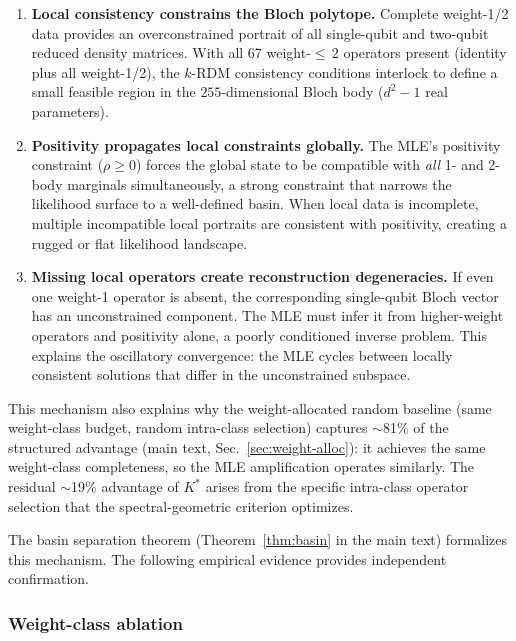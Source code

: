 \documentclass[twocolumn,prx,aps,superscriptaddress,longbibliography,floatfix]{revtex4-2}
\begin{document}
\begin{enumerate}
\item \textbf{Local consistency constrains the Bloch polytope.}
Complete weight-1/2 data provides an overconstrained portrait of
all single-qubit and two-qubit reduced density matrices.  With all
67 weight-${\le}\,2$ operators present (identity plus all weight-1/2), the $k$-RDM consistency
conditions interlock to define a small feasible region in the
$255$-dimensional Bloch body ($d^2 - 1$ real parameters).

\item \textbf{Positivity propagates local constraints globally.}
The MLE's positivity constraint ($\rho \geq 0$) forces the global
state to be compatible with \emph{all} 1- and 2-body marginals
simultaneously, a strong constraint that narrows the likelihood
surface to a well-defined basin.  When local data is incomplete,
multiple incompatible local portraits are consistent with
positivity, creating a rugged or flat likelihood landscape.

\item \textbf{Missing local operators create reconstruction
degeneracies.}  If even one weight-1 operator is absent, the
corresponding single-qubit Bloch vector has an unconstrained
component.  The MLE must infer it from higher-weight operators and
positivity alone, a poorly conditioned inverse problem.  This
explains the oscillatory convergence: the MLE cycles between
locally consistent solutions that differ in the unconstrained
subspace.
\end{enumerate}

This mechanism also explains why the weight-allocated random
baseline (same weight-class budget, random intra-class selection)
captures $\sim$81\% of the structured advantage (main text,
Sec.~\ref{sec:weight-alloc}): it achieves the same weight-class completeness, so the
MLE amplification operates similarly.  The residual $\sim$19\%
advantage of $K^*$ arises from the specific intra-class operator
selection that the spectral-geometric criterion optimizes.

The basin separation theorem (Theorem~\ref{thm:basin} in the main
text) formalizes this mechanism.  The following empirical evidence
provides independent confirmation.

\subsubsection{Weight-class ablation}
\end{document}
